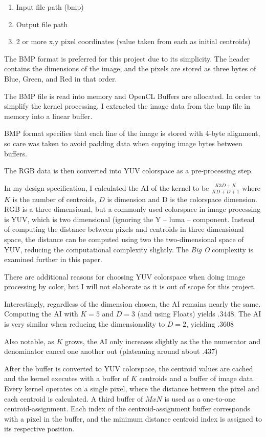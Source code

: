 \documentclass[11pt]{article}
\begin{document}
\begin{enumerate}
\item Input file path (bmp)
\item Output file path
\item 2 or more x,y pixel coordinates (value taken from each as initial centroids)
\end{enumerate}

The BMP format is preferred for this project due to its simplicity. The header
contains the dimensions of the image, and the pixels are stored as three bytes
of Blue, Green, and Red in that order. \cite{bmp-wiki}

The BMP file is read into memory and OpenCL Buffers are allocated. In order to
simplify the kernel processing, I extracted the image data from the bmp file in
memory into a linear buffer.

BMP format specifies that each line of the image is stored with 4-byte alignment,
so care was taken to avoid padding data when copying image bytes between buffers.

The RGB data is then converted into YUV colorspace as a pre-processing step.

In my design specification, I calculated the AI of the kernel to be
$\frac{K3D+K}{KD+D+1}$ where $K$ is the number of centroids, $D$ is dimension and
D is the colorspace dimension. RGB is a three dimensional, but a commonly used
colorspace in image processing is YUV, which is two dimensional (ignoring the Y
-- luma -- component. Instead of computing the distance between pixels and
centroids in three dimensional space, the distance can be computed using two the
two-dimensional space of YUV, reducing the computational complexity slightly. The
\emph{Big O} complexity is examined further in this paper.

There are additional reasons for choosing YUV colorspace when doing image processing
by color, but I will not elaborate as it is out of scope for this project.

Interestingly, regardless of the dimension chosen, the AI remains nearly the same.
Computing the AI with $K = 5$ and $D = 3$ (and using Floats) yields $.3448$. The AI
is very similar when reducing the dimensionality to $D = 2$, yielding $.3608$

Also notable, as $K$ grows, the AI only increases slightly as the the numerator and
denominator cancel one another out (plateauing around about $.437$)

After the buffer is converted to YUV colorspace, the centroid values are cached
and the kernel executes with a buffer of $K$ centroids and a buffer of image data.
Every kernel operates on a single pixel, where the distance between the pixel
and each centroid is calculated. A third buffer of $MxN$ is used as a one-to-one
centroid-assignment. Each index of the centroid-assignment buffer corresponds with
a pixel in the buffer, and the minimum distance centroid index is assigned to its
respective position.
\end{document}
